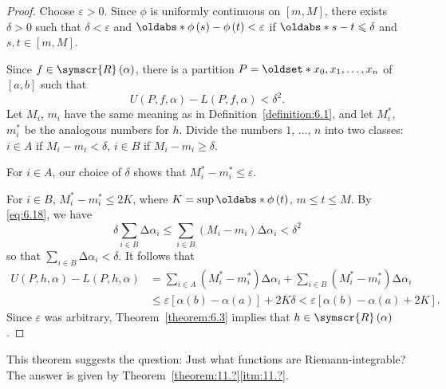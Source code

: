 \begin{proof}
    Choose \(\varepsilon>0\). Since \(\phi\) is uniformly continuous on \(\left[m,M\right]\), there exists \(\delta>0\) such that \(\delta<\varepsilon\) and \(\abs[\phi\left(s\right)-\phi\left(t\right)]<\varepsilon\) if \(\abs[s-t]\leqslant\delta\) and \(s,t\in\left[m,M\right]\).

    Since \(f\in\symscr{R}\left(\alpha\right)\), there is a partition \(P=\set{x_0,x_1,\ldots,x_n}\) of \(\left[a,b\right]\) such that
    \begin{equation}
        U\left(P,f,\alpha\right)-L\left(P,f,\alpha\right)<\delta^2.\label{eq:6.18}
    \end{equation}
    Let \(M_i\), \(m_i\) have the same meaning as in Definition~\ref{definition:6.1}, and let \(M_i^*\), \(m_i^*\) be the analogous numbers for \(h\). Divide the numbers \(1\), \(\ldots\), \(n\) into two classes: \(i\in A\) if \(M_i-m_i<\delta\), \(i\in B\) if \(M_i-m_i\geqslant\delta\).

    For \(i\in A\), our choice of \(\delta\) shows that \(M_i^*-m_i^*\leqslant\varepsilon\).
    
    For \(i\in B\), \(M_i^*-m_i^*\leqslant2K\), where \(K=\sup\abs[\phi\left(t\right)]\), \(m\leqslant t\leqslant M\). By \eqref{eq:6.18}, we have
    \begin{equation}
        \delta\sum_{i\in B}\increment\alpha_i\leqslant\sum_{i\in B}\left(M_i-m_i\right)\increment\alpha_i<\delta^2
    \end{equation}
    so that \(\sum_{i\in B}\increment\alpha_i<\delta\). It follows that
    \begin{align*}
        U\left(P,h,\alpha\right)-L\left(P,h,\alpha\right)&=\sum_{i\in A}\left(M_i^*-m_i^*\right)\increment\alpha_i+\sum_{i\in B}\left(M_i^*-m_i^*\right)\increment\alpha_i\\
        &\leqslant\varepsilon\left[\alpha\left(b\right)-\alpha\left(a\right)\right]+2K\delta<\varepsilon\left[\alpha\left(b\right)-\alpha\left(a\right)+2K\right].
    \end{align*}
    Since \(\varepsilon\) was arbitrary, Theorem~\ref{theorem:6.3} implies that \(h\in\symscr{R}\left(\alpha\right)\).
\end{proof}

\begin{remark*}
    This theorem suggests the question: Just what functions are Riemann-integrable? The answer is given by Theorem~\ref{theorem:11.?}\ref{itm:11.?}.
\end{remark*}
